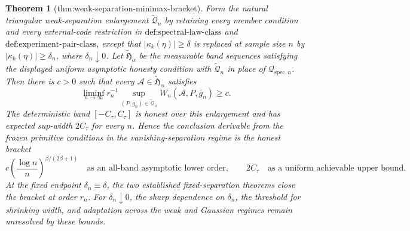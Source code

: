 \documentclass{article}
\newtheorem{theorem}{Theorem}
\begin{document}
\begin{theorem}[thm:weak-separation-minimax-bracket]\label{thm:weak-separation-minimax-bracket}
Form the natural triangular weak-separation enlargement \(\widetilde{\mathcal Q}_n\) by retaining every member condition and every external-code restriction in \(\text{def:spectral-law-class}\) and \(\text{def:experiment-pair-class}\), except that \(|\kappa_k(\eta)|\ge\delta\) is replaced at sample size \(n\) by \(|\kappa_k(\eta)|\ge\delta_n\), where \(\delta_n\downarrow0\).  Let \(\widetilde{\mathfrak H}_\alpha\) be the measurable band sequences satisfying the displayed uniform asymptotic honesty condition with \(\widetilde{\mathcal Q}_n\) in place of \(\mathcal Q_{\mathrm{spec},n}\).  Then there is \(c>0\) such that every \(\mathcal A\in\widetilde{\mathfrak H}_\alpha\) satisfies
\[
 \liminf_{n\to\infty}r_n^{-1}
 \sup_{(P,\bar g_n)\in\widetilde{\mathcal Q}_n}
 W_n(\mathcal A,P,\bar g_n)\ge c.
\]
The deterministic band \([-C_\tau,C_\tau]\) is honest over this enlargement and has expected sup-width \(2C_\tau\) for every \(n\).  Hence the conclusion derivable from the frozen primitive conditions in the vanishing-separation regime is the honest bracket
\[
 c\left(\frac{\log n}{n}\right)^{\beta/(2\beta+1)}
 \quad\text{as an all-band asymptotic lower order},
 \qquad
 2C_\tau\quad\text{as a uniform achievable upper bound}.
\]
At the fixed endpoint \(\delta_n\equiv\delta\), the two established fixed-separation theorems close the bracket at order \(r_n\).  For \(\delta_n\downarrow0\), the sharp dependence on \(\delta_n\), the threshold for shrinking width, and adaptation across the weak and Gaussian regimes remain unresolved by these bounds.
\end{theorem}
\end{document}

